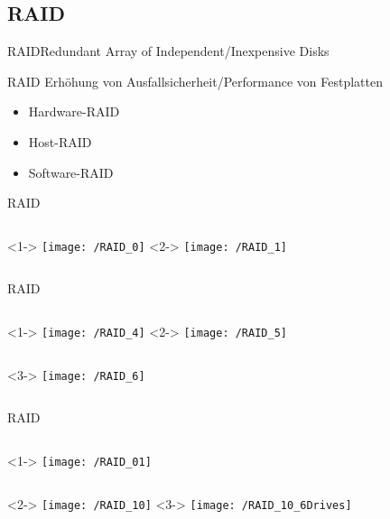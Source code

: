 \documentclass[pdflatex, ngerman, handout]{beamer}
\begin{document}
\subsection{RAID}

\begin{frame}{RAID}{Redundant Array of Independent/Inexpensive Disks}
\begin{block}{RAID}
Erhöhung von Ausfallsicherheit/Performance von Festplatten

\begin{itemize}
	\item Hardware-RAID
	\item Host-RAID
	\item Software-RAID
\end{itemize}
\end{block}
\end{frame}

\begin{frame}{RAID}%
\begin{columns}
<1->
\centering\texttt{[image: /RAID\_0]}
<2->
\centering\texttt{[image: /RAID\_1]}
\end{columns}
\end{frame}

\begin{frame}{RAID}%
\begin{columns}
<1->
\centering\texttt{[image: /RAID\_4]}
<2->
\centering\texttt{[image: /RAID\_5]}
\end{columns}
\begin{columns}
<3->
\centering\texttt{[image: /RAID\_6]}
\end{columns}
\end{frame}

\begin{frame}{RAID}%

\begin{columns}
<1->
\centering\texttt{[image: /RAID\_01]}
\end{columns}
\begin{columns}
<2->
\centering\texttt{[image: /RAID\_10]}
<3->
\centering\texttt{[image: /RAID\_10\_6Drives]}
\end{columns}
\end{frame}
\end{document}
